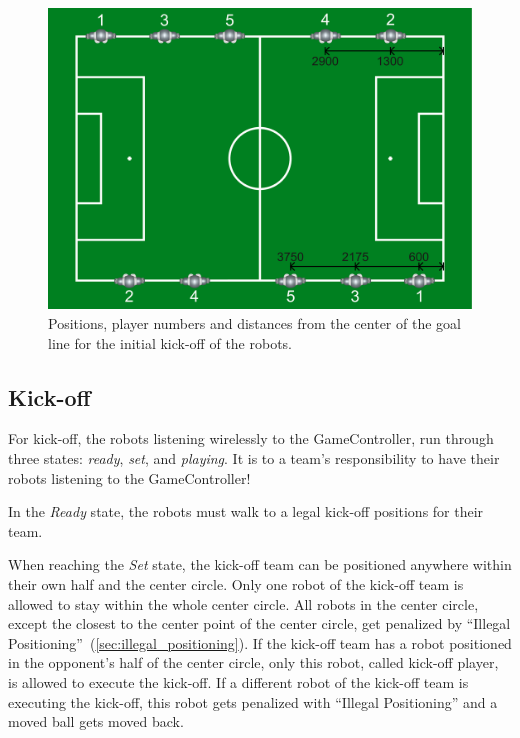 \begin{figure}[t!]
  \begin{center}
    \leavevmode
    \includegraphics[width=1\columnwidth]{figs/initial_positions.pdf}
    \caption{Positions, player numbers and distances from the center of the goal line for the initial kick-off of the robots.}
    \label{fig:initial_positions}
  \end{center}
\end{figure}

\subsection{Kick-off}
\label{sec:kick-off}
For kick-off, the robots listening wirelessly to the GameController, run through three states: \emph{ready}, \emph{set}, and \emph{playing}.
It is to a team's responsibility to have their robots listening to the GameController!

In the \textit{Ready} state, the robots must walk to a legal kick-off positions for their team.

When reaching the \textit{Set} state, the kick-off team can be positioned anywhere within their own half and the center circle.
Only one robot of the kick-off team is allowed to stay within the whole center circle.
All robots in the center circle, except the closest to the center point of the center circle, get penalized by ``Illegal Positioning''~(\cf \cref{sec:illegal_positioning}).
If the kick-off team has a robot positioned in the opponent's half of the center circle, only this robot, called kick-off player, is allowed to execute the kick-off.
If a different robot of the kick-off team is executing the kick-off, this robot gets penalized with ``Illegal Positioning'' and a moved ball gets moved back.

